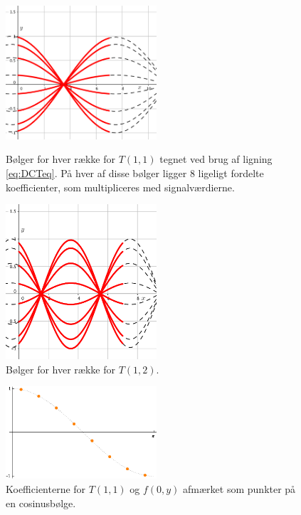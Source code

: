 \begin{figure}[!h]
\begin{minipage}[b]{0.5\linewidth}
\centering
\includegraphics[width=0.5\textwidth]{Billeder/Frekvens-eksempelu1v1.png}
\caption{Bølger for hver række for $T(1,1)$ tegnet ved brug af ligning \vref{eq:DCTeq}. På hver af disse bølger ligger 8 ligeligt fordelte koefficienter, som multipliceres med signalværdierne.}
\label{fig:frekeksu1v1}
\end{minipage}
\hspace{0.5cm}
\begin{minipage}[b]{0.5\linewidth}
\centering
\includegraphics[width=0.5\textwidth]{Billeder/Frekvens-eksempelu1v2.png}
\caption{Bølger for hver række for $T(1,2)$.}
\label{fig:frekeksu1v2}
\end{minipage}
\end{figure}

\begin{figure}[htbp]
\centering
\includegraphics[width=0.5\textwidth]{Billeder/coskoefficienter.png}
\caption{Koefficienterne for $T(1,1)$ og $f(0,y)$ afmærket som punkter på en cosinusbølge.}
\label{fig:cosko}
\end{figure}

